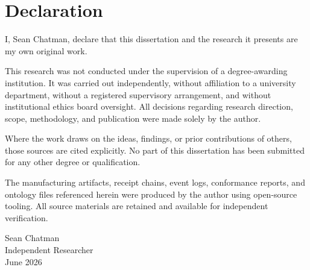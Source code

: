 \chapter*{Declaration}

I, Sean Chatman, declare that this dissertation and the research it presents are my own original work.

This research was not conducted under the supervision of a degree-awarding institution.
It was carried out independently, without affiliation to a university department, without a registered supervisory arrangement, and without institutional ethics board oversight.
All decisions regarding research direction, scope, methodology, and publication were made solely by the author.

Where the work draws on the ideas, findings, or prior contributions of others, those sources are cited explicitly.
No part of this dissertation has been submitted for any other degree or qualification.

The manufacturing artifacts, receipt chains, event logs, conformance reports, and ontology files referenced herein were produced by the author using open-source tooling.
All source materials are retained and available for independent verification.

\vspace{2cm}

\noindent Sean Chatman \\
Independent Researcher \\
June 2026

\newpage
